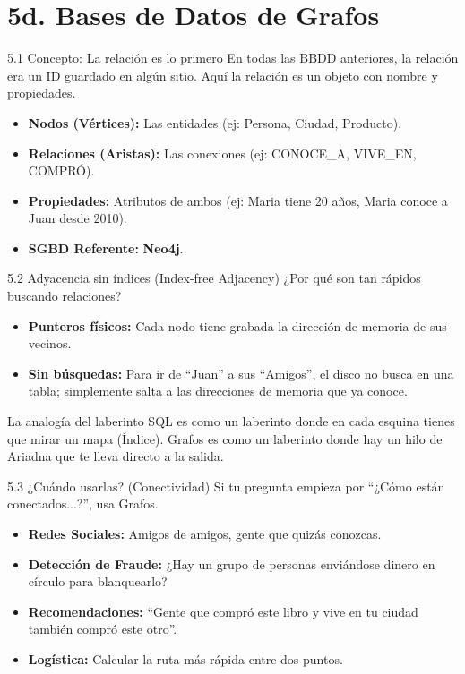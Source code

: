 \section{5d. Bases de Datos de Grafos}

\begin{frame}{5.1 Concepto: La relación es lo primero}
    En todas las BBDD anteriores, la relación era un ID guardado en algún sitio. Aquí la relación es un objeto con nombre y propiedades.
    \begin{itemize}
        \item \textbf{Nodos (Vértices):} Las entidades (ej: Persona, Ciudad, Producto).
        \item \textbf{Relaciones (Aristas):} Las conexiones (ej: CONOCE\_A, VIVE\_EN, COMPRÓ).
        \item \textbf{Propiedades:} Atributos de ambos (ej: Maria tiene 20 años, Maria conoce a Juan desde 2010).
        \item \textbf{SGBD Referente:} \textbf{Neo4j}.
    \end{itemize}
\end{frame}

\begin{frame}{5.2 Adyacencia sin índices (Index-free Adjacency)}
    ¿Por qué son tan rápidos buscando relaciones?
    \begin{itemize}
        \item \textbf{Punteros físicos:} Cada nodo tiene grabada la dirección de memoria de sus vecinos.
        \item \textbf{Sin búsquedas:} Para ir de ``Juan'' a sus ``Amigos'', el disco no busca en una tabla; simplemente salta a las direcciones de memoria que ya conoce.
    \end{itemize}
    \begin{exampleblock}{La analogía del laberinto}
        SQL es como un laberinto donde en cada esquina tienes que mirar un mapa (Índice). Grafos es como un laberinto donde hay un hilo de Ariadna que te lleva directo a la salida.
    \end{exampleblock}
\end{frame}

\begin{frame}{5.3 ¿Cuándo usarlas? (Conectividad)}
    Si tu pregunta empieza por ``¿Cómo están conectados...?'', usa Grafos.
    \begin{itemize}
        \item \textbf{Redes Sociales:} Amigos de amigos, gente que quizás conozcas.
        \item \textbf{Detección de Fraude:} ¿Hay un grupo de personas enviándose dinero en círculo para blanquearlo?
        \item \textbf{Recomendaciones:} ``Gente que compró este libro y vive en tu ciudad también compró este otro''.
        \item \textbf{Logística:} Calcular la ruta más rápida entre dos puntos.
    \end{itemize}
\end{frame}

